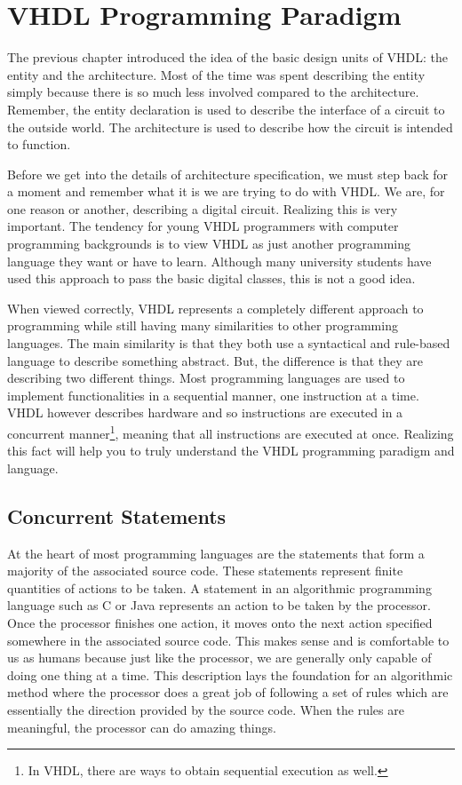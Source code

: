 %
%
\chapter{VHDL Programming Paradigm}
The previous chapter introduced the idea of the basic design units of VHDL: the entity and the architecture. Most of the time was spent describing the entity simply because there is so much less involved compared to the architecture. Remember, the entity declaration is used to describe the interface of a circuit to the outside world. The architecture is used to describe how the circuit is intended to function.

Before we get into the details of architecture specification, we must step back for a moment and remember what it is we are trying to do with VHDL. We are, for one reason or another, describing a digital circuit. Realizing this is very important. The tendency for young VHDL programmers with computer programming backgrounds is to view VHDL as just another programming language they want or have to learn. Although many university students have used this approach to pass the basic digital classes, this is not a good idea.

When viewed correctly, VHDL represents a completely different approach to programming while still having many similarities to other programming languages. The main similarity is that they both use a syntactical and rule-based language to describe something abstract. But, the difference is that they are describing two different things. Most programming languages are used to implement functionalities in a sequential manner, one instruction at a time. VHDL however describes hardware and so instructions are executed in a concurrent manner\footnote{In VHDL, there are ways to obtain sequential execution as well.}, meaning that all instructions are executed at once. Realizing this fact will help you to truly understand the VHDL programming paradigm and language.

\section{Concurrent Statements}
At the heart of most programming languages are the statements that form a majority of the associated source code. These statements represent finite quantities of actions to be taken. A statement in an algorithmic programming language such as C or Java represents an action to be taken by the processor. Once the processor finishes one action, it moves onto the next action specified somewhere in the associated source code. This makes sense and is comfortable to us as humans because just like the processor, we are generally only capable of doing one thing at a time. This description lays the foundation for an algorithmic method where the processor does a great job of following a set of rules which are essentially the direction provided by the source code. When the rules are meaningful, the processor can do amazing things.

